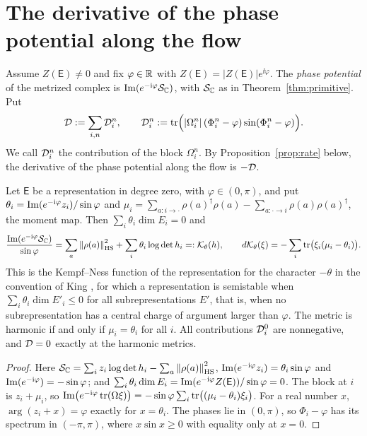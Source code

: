 \section{The derivative of the phase potential along the flow}\label{sec:rate}

Assume $Z(\mathsf E)\neq0$ and fix $\varphi\in\mathbb R$ with
$Z(\mathsf E)=|Z(\mathsf E)|e^{\ii\varphi}$. The \emph{phase potential} of the
metrized complex is $\operatorname{Im}(e^{-\mathrm i\varphi}\mathcal S_{\mathbb C})$, with $\mathcal S_{\mathbb C}$ as in
Theorem~\ref{thm:primitive}. Put
\[
 \mathcal D:=\sum_{i,n}\mathcal D_i^n,\qquad
 \mathcal D_i^n:=\operatorname{tr}\Bigl(|\Omega_i^n|\,(\Phi_i^n-\varphi)\sin(\Phi_i^n-\varphi)\Bigr).
\]
We call $\mathcal D_i^n$ the contribution of the block $\Omega_i^n$. By
Proposition~\ref{prop:rate} below, the derivative of the phase potential
along the flow is $-\mathcal D$.

\begin{proposition}[Representations]\label{prop:kempfness}
Let $\mathsf E$ be a representation in degree zero, with $\varphi\in(0,\pi)$,
and put $\theta_i=\operatorname{Im}(e^{-\mathrm i\varphi}z_i)/\sin\varphi$ and
$\mu_i=\sum_{a:i\to\cdot}\rho(a)^\dagger\rho(a)-\sum_{a:\cdot\to i}\rho(a)\rho(a)^\dagger$,
the moment map. Then $\sum_i\theta_i\dim E_i=0$ and
\[
 \frac{\operatorname{Im}(e^{-\mathrm i\varphi}\mathcal S_{\mathbb C})}{\sin\varphi}
 =\sum_a\left\lVert\rho(a)\right\rVert^2_{\mathrm{HS}}+\sum_i\theta_i\log\det h_i=:\mathcal K_\theta(h),\qquad
 d\mathcal K_\theta(\xi)=-\sum_i\operatorname{tr}\bigl(\xi_i(\mu_i-\theta_i)\bigr).
\]
This is the Kempf--Ness function of the representation for the character
$-\theta$ in the convention of King \cite{kin94}, for which a representation
is semistable when $\sum_i\theta_i\dim E'_i\leq0$ for all subrepresentations
$E'$, that is, when no subrepresentation has a central charge of argument
larger than $\varphi$. The metric is harmonic if and only if
$\mu_i=\theta_i$ for all $i$. All contributions $\mathcal D_i^0$ are nonnegative,
and $\mathcal D=0$ exactly at the harmonic metrics.
\end{proposition}

\begin{proof}
Here $\mathcal S_{\mathbb C}=\sum_iz_i\log\det h_i-\sum_a\left\lVert\rho(a)\right\rVert^2_{\mathrm{HS}}$,
$\operatorname{Im}(e^{-\mathrm i\varphi}z_i)=\theta_i\sin\varphi$ and
$\operatorname{Im}(e^{-\mathrm i\varphi})=-\sin\varphi$; and
$\sum_i\theta_i\dim E_i=\operatorname{Im}(e^{-\mathrm i\varphi}Z(\mathsf E))/\sin\varphi=0$. The
block at $i$ is $z_i+\mu_i$, so
$\operatorname{Im}\bigl(e^{-\mathrm i\varphi}\operatorname{tr}(\Omega\xi)\bigr)=-\sin\varphi\sum_i\operatorname{tr}\bigl((\mu_i-\theta_i)\xi_i\bigr)$.
For a real number $x$, $\arg(z_i+x)=\varphi$ exactly for $x=\theta_i$. The
phases lie in $(0,\pi)$, so $\Phi_i-\varphi$ has its spectrum in
$(-\pi,\pi)$, where $x\sin x\geq0$ with equality only at $x=0$.
\end{proof}

